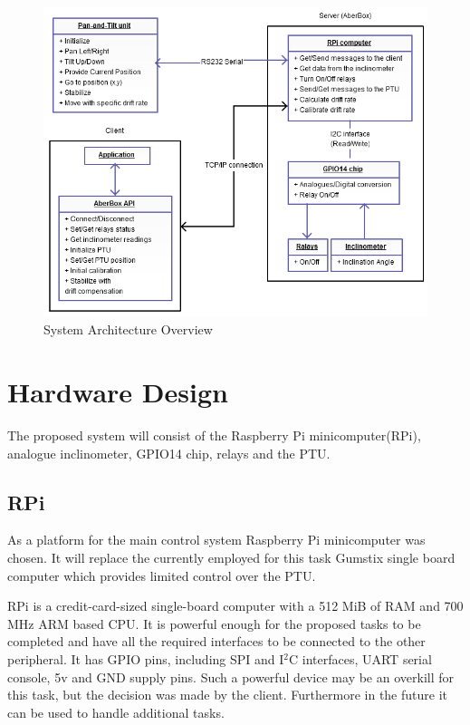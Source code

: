 \begin{figure}[H]
\centering
\centerline{\includegraphics[scale=0.80]{./images/SystemArchitectureOverview}}
\caption{System Architecture Overview}
\label{fig:SystemArchitectureOverview}
\end{figure}

\section{Hardware Design}
The proposed system will consist of the Raspberry Pi minicomputer(RPi), analogue inclinometer, GPIO14 chip, relays and the PTU.

\subsection{RPi}
As a platform for the main control system Raspberry Pi minicomputer was chosen. It will replace the currently employed for this task Gumstix single board computer which provides limited control over the PTU. 

RPi is a credit-card-sized single-board computer with a 512 MiB of RAM and 700 MHz ARM based CPU. It is powerful enough for the proposed tasks to be completed and have all the required interfaces to be connected to the other peripheral. It has GPIO pins, including SPI and I$^2$C interfaces, UART serial console, 5v and GND supply pins. Such a powerful device may be an overkill for this task, but the decision was made by the client. Furthermore in the future it can be used to handle additional tasks.

